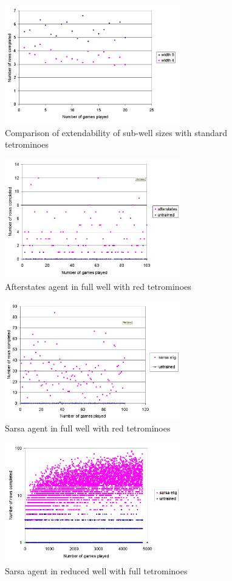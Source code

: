 \documentclass{rucsthesis}
\begin{document}
\begin{figure}[h]
\centering
\includegraphics[width=3in]{widthcomparrisonfulltet.png}
\caption{Comparison of extendability of sub-well sizes with standard tetrominoes}
\label{fig:widthcomparrisonfulltet}
\end{figure}


\begin{figure}[h]
\centering
\includegraphics[width=3in]{afterstatesredtetfullwell.png}
\caption{Afterstates agent in full well with red tetrominoes}
\label{fig:afterstatesredtetfullwell}
\end{figure}

\begin{figure}[h]
\centering
\includegraphics[width=3in]{sarsaeligredtetfullwell.png}
\caption{Sarsa agent in full well with red tetrominoes}
\label{fig:sarsaeligredtetfullwell}
\end{figure}

\begin{figure}[h]
\centering
\includegraphics[width=3in]{sarsaeligfulltetredwell.png}
\caption{Sarsa agent in reduced well with full tetrominoes}
\label{fig:sarsaeligfulltetredwell}
\end{figure}
\end{document}
